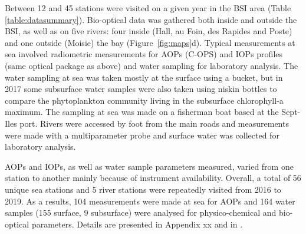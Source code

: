 \documentclass[essd, manuscript]{copernicus}
\begin{document}
Between 12 and 45 stations were visited on a given year in the BSI area (Table \ref{table:datasummary}). Bio-optical data was gathered both inside and outside the BSI, as well as on five rivers: four inside (Hall, au Foin, des Rapides and Poste) and one outside (Moisie) the bay (Figure~\ref{fig:maps}d).  Typical measurements at sea involved radiometric measurements for AOPs (C-OPS) and IOPs profiles (same optical package as above) and water sampling for laboratory analysis. The water sampling at sea was taken mostly at the surface using a bucket, but in 2017 some subsurface water samples were also taken using niskin bottles to compare the phytoplankton community living in the subsurface chlorophyll-a maximum. The sampling at sea was made on a fisherman boat based at the Sept-Iles port. Rivers were accessed by foot from the main roads and measurements were made with a multiparameter probe and surface water was collected for laboratory analysis.

AOPs and IOPs, as well as water sample parameters measured, varied from one station to another mainly because of instrument availability.   Overall, a total of 56 unique sea stations and 5 river stations were repeatedly visited from 2016 to 2019. As a results, 104 measurements were made at sea for AOPs and 164 water samples (155 surface, 9 subsurface) were analysed for physico-chemical and bio-optical parameters. Details are presented in Appendix xx and in \citet{Araujo2022}.

\end{document}

